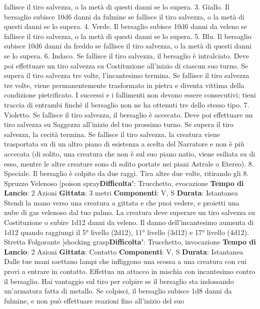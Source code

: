\begin{multicols}{2}
fallisce il tiro salvezza, o la metà di questi danni se lo
supera.
3. Giallo. Il bersaglio subisce 10d6 danni da fulmine se
fallisce il tiro salvezza, o la metà di questi danni se lo
supera.
4. Verde. Il bersaglio subisce 10d6 danni da veleno se
fallisce il tiro salvezza, o la metà di questi danni se lo
supera.
5. Blu. Il bersaglio subisce 10d6 danni da freddo se
fallisce il tiro salvezza, o la metà di questi danni se lo
supera.
6. Indaco. Se fallisce il tiro salvezza, il bersaglio è
intralciato. Deve poi effettuare un tiro salvezza su
Costituzione all’inizio di ciascun suo turno. Se supera il
tiro salvezza tre volte, l’incantesimo termina. Se fallisce
il tiro salvezza tre volte, viene permanentemente
trasformato in pietra e diventa vittima della condizione
pietrificato. I successi e i fallimenti non devono essere
consecutivi; tieni traccia di entrambi finché il bersaglio
non ne ha ottenuti tre dello stesso tipo.
7. Violetto. Se fallisce il tiro salvezza, il bersaglio è
accecato. Deve poi effettuare un tiro salvezza su
Saggezza all’inizio del tuo prossimo turno. Se supera il
tiro salvezza, la cecità termina. Se fallisce il tiro
salvezza, la creatura viene trasportata su di un altro
piano di esistenza a scelta del Narratore e non è più accecata
(di solito, una creatura che non è sul suo piano natio,
viene esiliata su di esso, mentre le altre creature sono
di solito portate nei piani Astrale o Etereo).
8. Speciale. Il bersaglio è colpito da due raggi. Tira
altre due volte, ritirando gli 8.
Spruzzo Velenoso
[poison spray\textbf{Difficolta'}:
Trucchetto, evocazione
\textbf{Tempo di Lancio}: 2 Azioni
\textbf{Gittata}: 3 metri
\textbf{Componenti}: V, S
\textbf{Durata}: Istantanea
Stendi la mano verso una creatura a gittata e che puoi
vedere, e proietti una nube di gas velenoso dal tuo
palmo. La creatura deve superare un tiro salvezza su
Costituzione o subire 1d12 danni da veleno.
Il danno dell’incantesimo aumenta di 1d12 quando
raggiungi il 5° livello (2d12), 11° livello (3d12) e 17°
livello (4d12).
Stretta Folgorante
[shocking grasp\textbf{Difficolta'}:
Trucchetto, invocazione
\textbf{Tempo di Lancio}: 2 Azioni
\textbf{Gittata}: Contatto
\textbf{Componenti}: V, S
\textbf{Durata}: Istantanea
Dalle tue mani saettano lampi che infliggono una
scossa a una creatura con cui provi a entrare in
contatto. Effettua un attacco in mischia con incantesimo
contro il bersaglio. Hai vantaggio sul tiro per colpire se il
bersaglio sta indossando un’armatura fatta di metallo.
Se colpisci, il bersaglio subisce 1d8 danni da fulmine, e
non può effettuare reazioni fino all’inizio del suo

\end{multicols}
